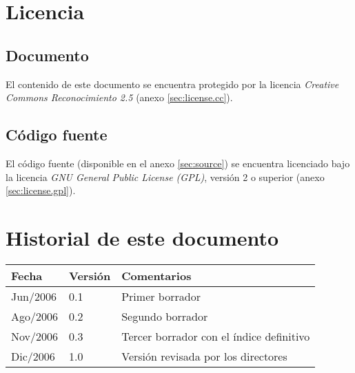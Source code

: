 \documentclass[spanish,a4paper,12pt,twosides]{book}
\begin{document}
\chapter*{Licencia}

\section*{Documento}

El contenido de este documento se encuentra protegido por la licencia 
\emph{Creative Commons Reconocimiento 2.5} (anexo \ref{sec:license.cc}).

\section*{Código fuente}

El código fuente (disponible en el anexo \ref{sec:source}) se encuentra 
licenciado bajo la licencia \emph{GNU General Public License (GPL)}, 
versión 2 o superior (anexo \ref{sec:license.gpl}).

\chapter*{Historial de este documento}

\begin{tabular}{|l|l|l|}
 \hline
 \textbf{Fecha} & \textbf{Versión} & \textbf{Comentarios} \\\hline
 Jun/2006 & 0.1 & Primer borrador \\\hline
 Ago/2006 & 0.2 & Segundo borrador \\\hline
 Nov/2006 & 0.3 & Tercer borrador con el índice definitivo \\\hline
 Dic/2006 & 1.0 & Versión revisada por los directores \\\hline
\end{tabular}

\tableofcontents

\newpage

\listoffigures

\newpage

\listoftables

\newpage

\mainmatter









\appendix




\end{document}
